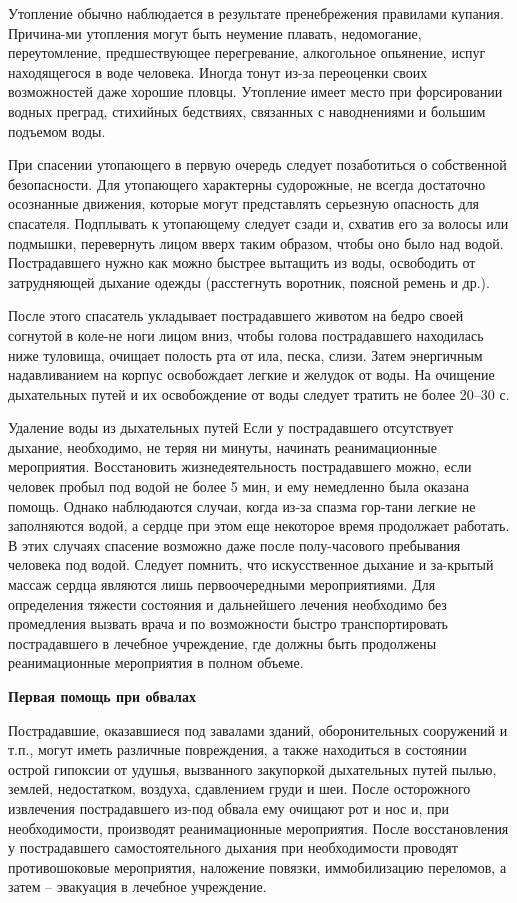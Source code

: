 \documentclass[12pt,a4paper]{report}
\begin{document}
Утопление обычно наблюдается в результате пренебрежения правилами купания. Причина-ми утопления могут быть неумение плавать, недомогание, переутомление, предшествующее перегревание, алкогольное опьянение, испуг находящегося в воде человека. Иногда тонут из-за переоценки своих возможностей даже хорошие пловцы. Утопление имеет место при форсировании водных преград, стихийных бедствиях, связанных с наводнениями и большим подъемом воды.

При спасении утопающего в первую очередь следует позаботиться о собственной безопасности. Для утопающего характерны судорожные, не всегда достаточно осознанные движения, которые могут представлять серьезную опасность для спасателя.
Подплывать к утопающему следует сзади и, схватив его за волосы или подмышки, перевернуть лицом вверх таким образом, чтобы оно было над водой. Пострадавшего нужно как можно быстрее вытащить из воды, освободить от затрудняющей дыхание одежды (расстегнуть воротник, поясной ремень и др.).

После этого спасатель укладывает пострадавшего животом на бедро своей согнутой в коле-не ноги лицом вниз, чтобы голова пострадавшего находилась ниже туловища, очищает полость рта от ила, песка, слизи. Затем энергичным надавливанием на корпус освобождает легкие и желудок от воды. На очищение дыхательных путей и их освобождение от воды следует тратить не более 20–30 с.

Удаление воды из дыхательных путей Если у пострадавшего отсутствует дыхание, необходимо, не теряя ни минуты, начинать реанимационные мероприятия.
Восстановить жизнедеятельность пострадавшего можно, если человек пробыл под водой не более 5 мин, и ему немедленно была оказана помощь. Однако наблюдаются случаи, когда из-за спазма гор-тани легкие не заполняются водой, а сердце при этом еще некоторое время продолжает работать. В этих случаях спасение возможно даже после полу-часового пребывания человека под водой.
Следует помнить, что искусственное дыхание и за-крытый массаж сердца являются лишь первоочередными мероприятиями.
Для определения тяжести состояния и дальнейшего лечения необходимо без промедления вызвать врача и по возможности быстро транспортировать пострадавшего в лечебное учреждение, где должны быть продолжены реанимационные мероприятия в полном объеме.

\textbf{Первая помощь при обвалах	}

Пострадавшие, оказавшиеся под завалами зданий, оборонительных сооружений и т.п., могут иметь различные повреждения, а также находиться в состоянии острой гипоксии от удушья, вызванного закупоркой дыхательных путей пылью, землей, недостатком, воздуха, сдавлением груди и шеи.
После осторожного извлечения пострадавшего из-под обвала ему очищают рот и нос и, при необходимости, производят реанимационные мероприятия. После восстановления у пострадавшего самостоятельного дыхания при необходимости проводят противошоковые мероприятия, наложение повязки, иммобилизацию переломов, а затем – эвакуация в лечебное учреждение.
\end{document}
